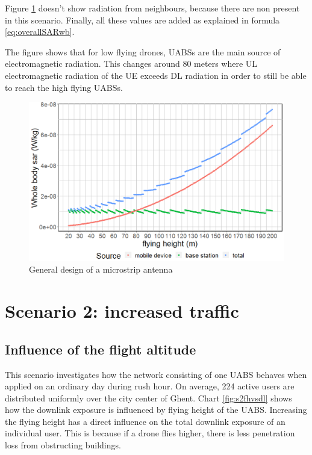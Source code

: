 Figure \ref{fig:s1_fhsar} doesn't show radiation from neighbours, because there are non present in this scenario. Finally, all these values are added as explained in formula
\ref{eq:overallSARwb}. 

The figure shows that for low flying drones, \gls{UABS}s are the main source of electromagnetic radiation.
This changes around 80 meters where \gls{UL} electromagnetic radiation of the \gls{UE}
exceeds \gls{DL} radiation in order to still be able to reach the high flying \gls{UABS}s.


\begin{figure}[th!]
  \includegraphics[width=\textwidth]{../results/s1/fhvssar2.png}
  \caption{General design of a microstrip antenna}
  \label{fig:s1_fhsar}
\end{figure}

\section{Scenario 2: increased traffic}

\subsection{Influence of the flight altitude}
This scenario investigates how the network consisting of one \gls{UABS} behaves when applied on an ordinary day during rush hour. 
On average, 224 active users are distributed uniformly over the city center of Ghent. 
Chart \ref{fig:s2fhvsdl} shows how the downlink exposure is influenced by flying height of the \gls{UABS}. 
Increasing the flying height has a direct influence on the total downlink exposure of an individual user. 
This is because if a drone flies higher, there is less penetration loss from obstructing buildings.

